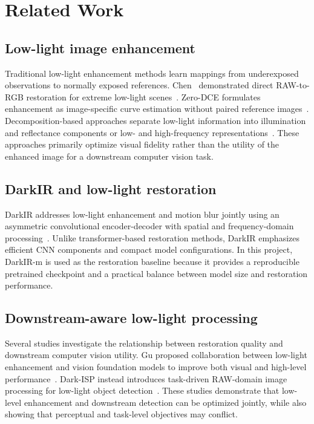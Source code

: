 \section{Related Work}
\label{sec:related_work}

\subsection{Low-light image enhancement}

Traditional low-light enhancement methods learn mappings from
underexposed observations to normally exposed references. Chen
\etal~demonstrated direct RAW-to-RGB restoration for extreme low-light
scenes~\cite{chen2018learning}. Zero-DCE formulates enhancement as
image-specific curve estimation without paired reference
images~\cite{guo2020zero}. Decomposition-based approaches separate
low-light information into illumination and reflectance components or
low- and high-frequency representations~\cite{xu2020restore,uretinex2022}.
These approaches primarily optimize visual fidelity rather than the utility
of the enhanced image for a downstream computer vision task.

\subsection{DarkIR and low-light restoration}

DarkIR addresses low-light enhancement and motion blur jointly using an
asymmetric convolutional encoder-decoder with spatial and frequency-domain
processing~\cite{feijoo2025darkir}. Unlike transformer-based restoration
methods, DarkIR emphasizes efficient CNN components and compact model
configurations. In this project, DarkIR-m is used as the restoration
baseline because it provides a reproducible pretrained checkpoint and a
practical balance between model size and restoration performance.

\subsection{Downstream-aware low-light processing}

Several studies investigate the relationship between restoration quality
and downstream computer vision utility. Gu \etal proposed collaboration
between low-light enhancement and vision foundation models to improve both
visual and high-level performance~\cite{gu2025foundation}. Dark-ISP instead
introduces task-driven RAW-domain image processing for low-light object
detection~\cite{guo2025darkisp}. These studies demonstrate that low-level
enhancement and downstream detection can be optimized jointly, while also
showing that perceptual and task-level objectives may conflict.

